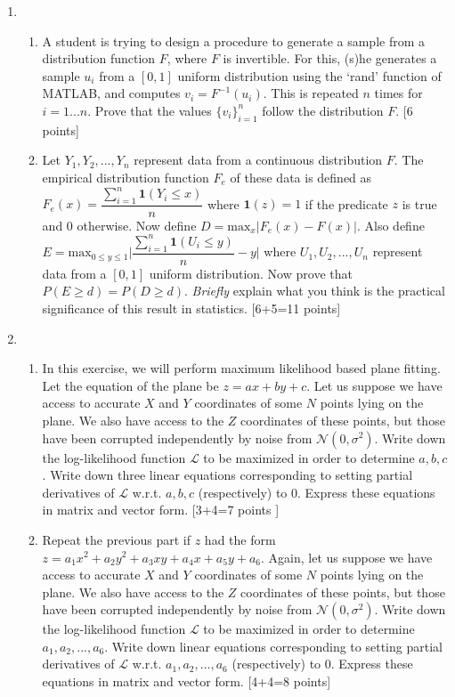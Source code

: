 \documentclass[11pt]{article}
\begin{document}
\begin{enumerate}
\item \begin{enumerate}
\item A student is trying to design a procedure to generate a sample from a distribution function $F$, where $F$ is invertible. For this, (s)he generates a sample $u_i$ from a $[0,1]$ uniform distribution using the `rand' function of MATLAB, and computes $v_i = F^{-1}(u_i)$. This is repeated $n$ times for $i = 1 ... n$. Prove that the values $\{v_i\}_{i=1}^n$  follow the distribution $F$. \textsf{[6 points]}
\item Let $Y_1, Y_2, ..., Y_n$ represent data from a continuous distribution $F$. The empirical distribution function $F_e$ of these data is defined as $F_e(x) = \dfrac{\sum_{i=1}^n \mathbf{1}(Y_i \leq x)}{n}$ where $\mathbf{1}(z) = 1$ if the predicate $z$ is true and 0 otherwise. Now define $D = \textrm{max}_x | F_e(x)-F(x) |$. Also define $E = \textrm{max}_{0 \leq y \leq 1} \Big|\dfrac{\sum_{i=1}^n \mathbf{1}(U_i \leq y)}{n} - y \Big|$ where $U_1, U_2, ..., U_n$ represent data from a $[0,1]$ uniform distribution. Now prove that $P(E \geq d) = P(D \geq d)$. \emph{Briefly} explain what you think is the practical significance of this result in statistics. \textsf{[6+5=11 points]}
\end{enumerate}

\item 
\begin{enumerate}
\item In this exercise, we will perform maximum likelihood based plane fitting. Let the equation of the plane be $z = ax + by + c$. Let us suppose we have access to accurate $X$ and $Y$ coordinates of some $N$ points lying on the plane. We also have access to the $Z$ coordinates of these points, but those have been corrupted independently by noise from $\mathcal{N}(0,\sigma^2)$. Write down the log-likelihood function $\mathcal{L}$ to be maximized in order to determine $a,b,c$. Write down three linear equations corresponding to setting partial derivatives of $\mathcal{L}$ w.r.t. $a,b,c$ (respectively) to 0. Express these equations in matrix and vector form. \textsf{[3+4=7 points ]} \\

\item Repeat the previous part if $z$ had the form $z = a_1 x^2 + a_2 y^2 + a_3 xy + a_4 x + a_5 y + a_6$. Again, let us suppose we have access to accurate $X$ and $Y$ coordinates of some $N$ points lying on the plane. We also have access to the $Z$ coordinates of these points, but those have been corrupted independently by noise from $\mathcal{N}(0,\sigma^2)$. Write down the log-likelihood function $\mathcal{L}$ to be maximized in order to determine $a_1,a_2,...,a_6$. Write down linear equations corresponding to setting partial derivatives of $\mathcal{L}$ w.r.t. $a_1,a_2,...,a_6$ (respectively) to 0. Express these equations in matrix and vector form. \textsf{[4+4=8 points]}\\


\end{enumerate}
\end{enumerate}
\end{document}

